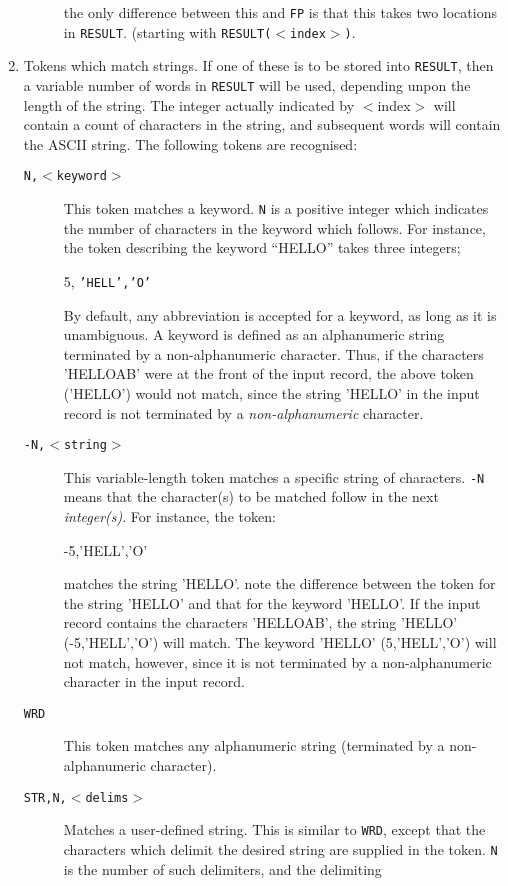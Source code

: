 \begin{enumerate}
\begin{description}
the only difference between this and {\tt FP} is that this
takes two locations in {\tt RESULT}.
(starting with {\tt RESULT($<$index$>$)}.
\end{description}
\item  Tokens which match strings. If one of these is to be stored
into {\tt RESULT}, then a variable number of words in {\tt RESULT} 
will be used,
depending unpon the length of the string. The integer actually indicated
by $<$index$>$ will contain a count of characters in the string, and
subsequent words will contain the ASCII string. The following tokens
are recognised:
\begin{description}
\item[{\tt N,$<$keyword$>$}] This token matches a keyword. 
{\tt N} is a positive
integer which indicates the number of characters in
the keyword which follows. For instance, the token
describing the keyword ``HELLO''  takes three integers;
\begin{center}
5, {\tt 'HELL','O'}
\end{center}
By default, any abbreviation is accepted for a
keyword, as long as it is unambiguous. A keyword is
defined as an alphanumeric string terminated by a
non-alphanumeric character. Thus, if the characters
'HELLOAB' were at the front of the input record,  the
above token ('HELLO') would not match, since the
string 'HELLO' in the input record is not terminated by
a {\em non-alphanumeric} character.
\item[{\tt -N,$<$string$>$}]    This variable-length token matches a specific
string of characters.  {\tt -N} means that the
character(s) to be matched follow in the next
{\em integer(s)}. For instance, the token:
\begin{center}
-5,'HELL','O'
\end{center}
matches the string 'HELLO'. note the difference
between the token for the string 'HELLO' and that for
the keyword 'HELLO'. If the input record contains the
characters 'HELLOAB', the string 'HELLO'
(-5,'HELL','O') will match. The keyword 'HELLO'
(5,'HELL','O') will not match, however, since it is
not terminated by a non-alphanumeric character in the
input record.
\item[{\tt WRD}]  This token matches any alphanumeric string
(terminated by a non-alphanumeric character).
\item[{\tt STR,N,$<$delims$>$}] Matches a user-defined string. This is similar
to {\tt WRD}, except that the characters which delimit
the desired string are supplied in the token. {\tt N} is
the number of such delimiters, and the delimiting

\end{description}
\end{enumerate}
